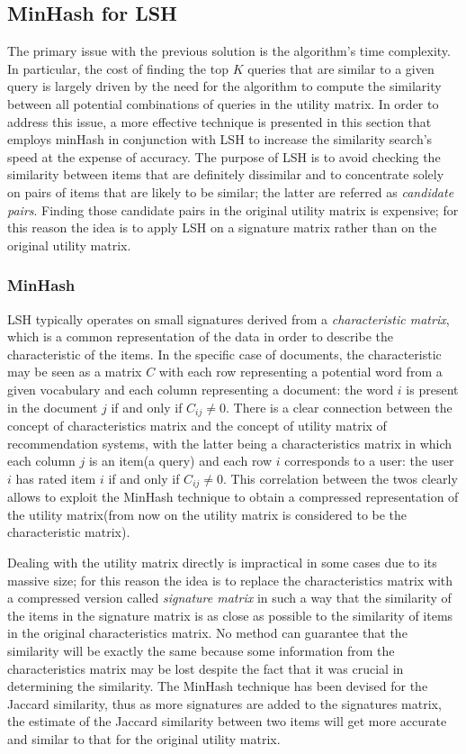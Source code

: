 \subsection{MinHash for LSH}
\label{minhash_section}
The primary issue with the previous solution is the algorithm's time complexity. In particular, the cost of finding the top $K$ queries that are similar to a given query is largely driven by the need for the algorithm to compute the similarity between all potential combinations of queries in the utility matrix. In order to address this issue, a more effective technique is presented in this section that employs minHash in conjunction with LSH to increase the similarity search's speed at the expense of accuracy. The purpose of LSH is to avoid checking the similarity between items that are definitely dissimilar and to concentrate solely on pairs of items that are likely to be similar; the latter are referred as \emph{candidate pairs}. Finding those candidate pairs in the original utility matrix is expensive; for this reason the idea is to apply LSH on a signature matrix rather than on the original utility matrix.

\subsubsection{MinHash} LSH typically operates on small signatures derived from a \emph{characteristic matrix}, which is a common representation of the data in order to describe the characteristic of the items. In the specific case of documents, the characteristic may be seen as a matrix $C$ with each row representing a potential word from a given vocabulary and each column representing a document: the word $i$ is present in the document $j$ if and only if $C_{ij} \neq 0$. There is a clear connection between the concept of characteristics matrix and the concept of utility matrix of recommendation systems, with the latter being a characteristics matrix in which each column $j$ is an item(a query) and each row $i$ corresponds to a user: the user $i$ has rated item $i$ if and only if $C_{ij} \neq 0$. This correlation between the twos clearly allows to exploit the MinHash technique to obtain a compressed representation of the utility matrix(from now on the utility matrix is considered to be the characteristic matrix). 

Dealing with the utility matrix directly is impractical in some cases due to its massive size; for this reason the idea is to replace the characteristics matrix with a compressed version called \emph{signature matrix} in such a way that the similarity of the items in the signature matrix is as close as possible to the similarity of items in the original characteristics matrix. No method can guarantee that the similarity will be exactly the same because some information from the characteristics matrix may be lost despite the fact that it was crucial in determining the similarity. The MinHash technique\cite{minhash} has been devised for the Jaccard similarity, thus as more signatures are added to the signatures matrix, the estimate of the Jaccard similarity between two items will get more accurate and similar to that for the original utility matrix.

